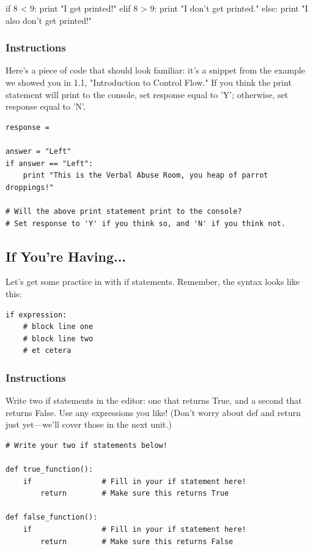 \documentclass[12pt,a4paper,final,twoside,onecolumn,titlepage]{book}
\begin{document}
if 8 < 9:
    print "I get printed!"
elif 8 > 9:
    print "I don't get printed."
else:
    print "I also don't get printed!"

\subsubsection{Instructions}

Here's a piece of code that should look familiar: it's a snippet from the example we showed you in 1.1, "Introduction to Control Flow." If you think the print statement will print to the console, set response equal to 'Y'; otherwise, set response equal to 'N'.

\begin{lstlisting}
response = 

answer = "Left"
if answer == "Left":
    print "This is the Verbal Abuse Room, you heap of parrot droppings!"
    
# Will the above print statement print to the console?
# Set response to 'Y' if you think so, and 'N' if you think not.
\end{lstlisting}

\subsection{If You're Having...}

Let's get some practice in with if statements. Remember, the syntax looks like this:

\begin{lstlisting}
if expression:
    # block line one
    # block line two
    # et cetera
\end{lstlisting}

\subsubsection{Instructions}

Write two if statements in the editor: one that returns True, and a second that returns False. Use any expressions you like! (Don't worry about def and return just yet—we'll cover those in the next unit.)

\begin{lstlisting}
# Write your two if statements below!

def true_function():
    if                # Fill in your if statement here!
        return        # Make sure this returns True

def false_function():
    if                # Fill in your if statement here!
        return        # Make sure this returns False
\end{lstlisting}
\end{document}
